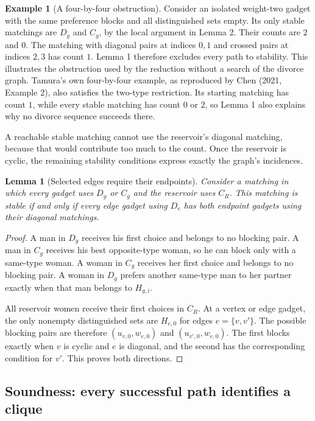 \documentclass[11pt,letterpaper]{article}
\newtheorem{lemma}{Lemma}
\theoremstyle{definition}
\newtheorem{example}{Example}
\begin{document}
\begin{example}[A four-by-four obstruction]
Consider an isolated weight-two gadget with the same preference blocks and all distinguished sets empty. Its only stable matchings are $D_g$ and $C_g$, by the local argument in Lemma 2. Their counts are $2$ and $0$. The matching with diagonal pairs at indices $0,1$ and crossed pairs at indices $2,3$ has count $1$. Lemma 1 therefore excludes every path to stability. This illustrates the obstruction used by the reduction without a search of the divorce graph. Tamura's own four-by-four example, as reproduced by Chen (2021, Example 2), also satisfies the two-type restriction. Its starting matching has count $1$, while every stable matching has count $0$ or $2$, so Lemma 1 also explains why no divorce sequence succeeds there.
\end{example}

A reachable stable matching cannot use the reservoir's diagonal matching, because that would contribute too much to the count. Once the reservoir is cyclic, the remaining stability conditions express exactly the graph's incidences.

\begin{lemma}[Selected edges require their endpoints]
Consider a matching in which every gadget uses $D_g$ or $C_g$ and the reservoir uses $C_R$. This matching is stable if and only if every edge gadget using $D_e$ has both endpoint gadgets using their diagonal matchings.
\end{lemma}
\begin{proof}
A man in $D_g$ receives his first choice and belongs to no blocking pair. A man in $C_g$ receives his best opposite-type woman, so he can block only with a same-type woman. A woman in $C_g$ receives her first choice and belongs to no blocking pair. A woman in $D_g$ prefers another same-type man to her partner exactly when that man belongs to $H_{g,i}$.

All reservoir women receive their first choices in $C_R$. At a vertex or edge gadget, the only nonempty distinguished sets are $H_{e,0}$ for edges $e=\{v,v'\}$. The possible blocking pairs are therefore $(u_{v,0},w_{e,0})$ and $(u_{v',0},w_{e,0})$. The first blocks exactly when $v$ is cyclic and $e$ is diagonal, and the second has the corresponding condition for $v'$. This proves both directions.
\end{proof}

\subsection{Soundness: every successful path identifies a clique}
\end{document}
